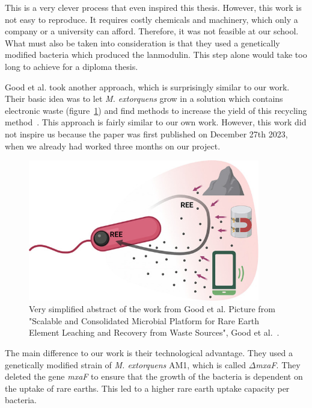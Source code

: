 This is a very clever process that even inspired this thesis.
However, this work is not easy to reproduce.
It requires costly chemicals and machinery, which only a company or a university can afford.
Therefore, it was not feasible at our school.
What must also be taken into consideration is that they used a genetically modified bacteria which produced the lanmodulin.
This step alone would take too long to achieve for a diploma thesis.

\vspace{2em}

Good et al. took another approach, which is surprisingly similar to our work.
Their basic idea was to let \emph{M. extorquens} grow in a solution which contains electronic waste (figure~\ref{fig:similar_work}) and find methods to increase the yield of this recycling method~\cite{similarwork}.
This approach is fairly similar to our own work.
However, this work did not inspire us because the paper was first published on December 27th 2023, when we already had worked three months on our project.

\begin{figure}[H]
    \centering
    \includegraphics[width=0.9\textwidth]{./media/images/similar_work}
    \caption{Very simplified abstract of the work from Good et al.
    Picture from "Scalable and Consolidated Microbial Platform for Rare Earth Element Leaching and Recovery from Waste Sources", Good et al.~\cite{similarwork}.}
    \label{fig:similar_work}
\end{figure}

The main difference to our work is their technological advantage.
They used a genetically modified strain of \emph{M. extorquens} AM1, which is called \(\Delta\)\emph{mxaF}.
They deleted the gene \emph{mxaF} to ensure that the growth of the bacteria is dependent on the uptake of rare earths.
This led to a higher rare earth uptake capacity per bacteria.

